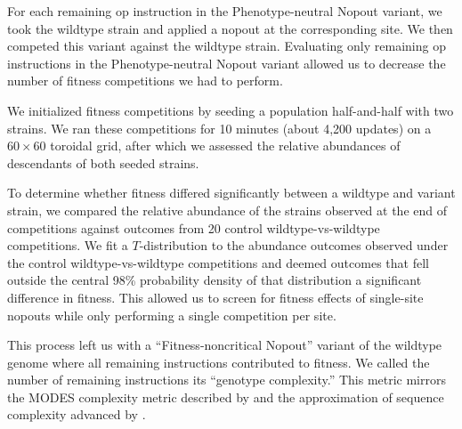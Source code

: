For each remaining op instruction in the Phenotype-neutral Nopout variant, we took the wildtype strain and applied a nopout at the corresponding site.
We then competed this variant against the wildtype strain.
Evaluating only remaining op instructions in the Phenotype-neutral Nopout variant allowed us to decrease the number of fitness competitions we had to perform.

We initialized fitness competitions by seeding a population half-and-half with two strains.
We ran these competitions for 10 minutes (about 4,200 updates) on a $60\times60$ toroidal grid, after which we assessed the relative abundances of descendants of both seeded strains.

To determine whether fitness differed significantly between a wildtype and variant strain, we compared the relative abundance of the strains observed at the end of competitions against outcomes from 20 control wildtype-vs-wildtype competitions.
We fit a $T$-distribution to the abundance outcomes observed under the control wildtype-vs-wildtype competitions and deemed outcomes that fell outside the central 98\% probability density of that distribution a significant difference in fitness.
This allowed us to screen for fitness effects of single-site nopouts while only performing a single competition per site.

This process left us with a ``Fitness-noncritical Nopout'' variant of the wildtype genome where all remaining instructions contributed to fitness.
We called the number of remaining instructions its ``genotype complexity.''
This metric mirrors the MODES complexity metric described by \citet{dolson2019modes} and the approximation of sequence complexity advanced by \citet{adami2000evolution}.



